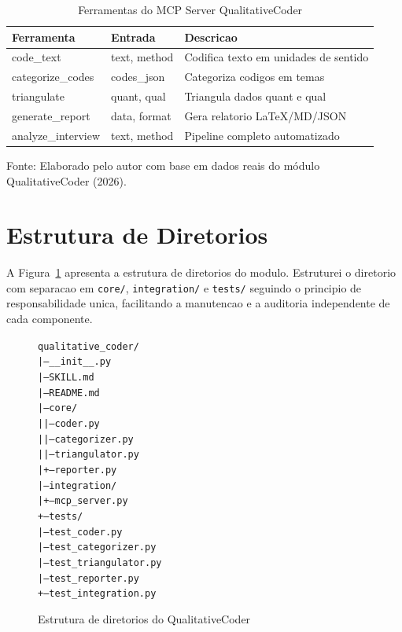 \begin{table}[htbp]
    \centering
    \caption{Ferramentas do MCP Server QualitativeCoder}
    \label{tab:qc_mcp_tools}
    \small
    \begin{tabular}{lp{4.5cm}p{5cm}}
        \toprule
        \textbf{Ferramenta} & \textbf{Entrada} & \textbf{Descricao} \\
        \midrule
        code\_text & text, method & Codifica texto em unidades de sentido \\
        categorize\_codes & codes\_json & Categoriza codigos em temas \\
        triangulate & quant, qual & Triangula dados quant e qual \\
        generate\_report & data, format & Gera relatorio LaTeX/MD/JSON \\
        analyze\_interview & text, method & Pipeline completo automatizado \\
        \bottomrule
    \end{tabular}
    \par\medskip
    \footnotesize{Fonte: Elaborado pelo autor com base em dados reais do módulo QualitativeCoder (2026).}
\end{table}

\section{Estrutura de Diretorios}
\label{sec:qc_estrutura}

A Figura~\ref{fig:qc_estrutura} apresenta a estrutura de diretorios do modulo. Estruturei o diretorio com separacao em \texttt{core/}, \texttt{integration/} e \texttt{tests/} seguindo o principio de responsabilidade unica, facilitando a manutencao e a auditoria independente de cada componente.

\begin{figure}[htbp]
    \centering
    \begin{minipage}{0.5\textwidth}
    \begin{alltt}
\footnotesize
qualitative\_coder/
|-- \_\_init\_\_.py
|-- SKILL.md
|-- README.md
|-- core/
|   |-- coder.py
|   |-- categorizer.py
|   |-- triangulator.py
|   +-- reporter.py
|-- integration/
|   +-- mcp\_server.py
+-- tests/
    |-- test\_coder.py
    |-- test\_categorizer.py
    |-- test\_triangulator.py
    |-- test\_reporter.py
    +-- test\_integration.py
    \end{alltt}
    \end{minipage}
    \caption{Estrutura de diretorios do QualitativeCoder}
    \label{fig:qc_estrutura}
\end{figure}

